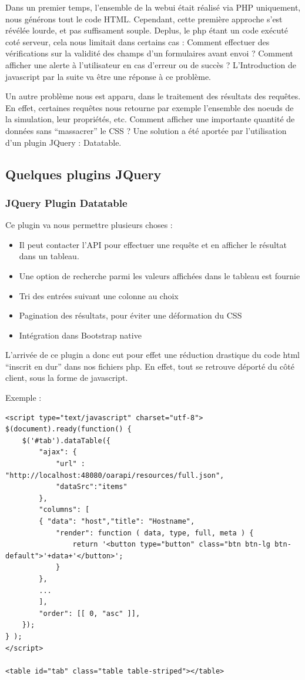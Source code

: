 \documentclass[a4paper,10pt]{article}
\begin{document}
Dans un premier temps, l'ensemble de la webui était réalisé via PHP uniquement, nous générons tout le code HTML. Cependant, cette première approche s'est révélée lourde, et pas suffisament souple.
Deplus, le php étant un code exécuté coté serveur, cela nous limitait dans certains cas : Comment effectuer des vérifications sur la validité des champs d'un formulaires avant envoi ? Comment afficher une alerte à l'utilisateur
en cas d'erreur ou de succès ? L'Introduction de javascript par la suite va être une réponse à ce problème.
\vspace{0.5cm}

Un autre problème nous est apparu, dans le traitement des résultats des requêtes. En effet, certaines requêtes nous retourne par exemple l'ensemble des noeuds de la simulation, leur propriétés, etc. Comment afficher une importante
quantité de données sans ``massacrer'' le CSS ? Une solution a été aportée par l'utilisation d'un plugin JQuery : Datatable.
\newpage
\subsection{Quelques plugins JQuery}
\subsubsection{JQuery Plugin Datatable}
Ce plugin va nous permettre plusieurs choses :
\begin{itemize}
 \item Il peut contacter l'API pour effectuer une requête et en afficher le résultat dans un tableau.
 \item Une option de recherche parmi les valeurs affichées dans le tableau est fournie
 \item Tri des entrées suivant une colonne au choix
 \item Pagination des résultats, pour éviter une déformation du CSS
 \item Intégration dans Bootstrap native
\end{itemize}

L'arrivée de ce plugin a donc eut pour effet une réduction drastique du code html ``inscrit en dur'' dans nos fichiers php.
En effet, tout se retrouve déporté du côté client, sous la forme de javascript.

Exemple :
\begin{lstlisting}
<script type="text/javascript" charset="utf-8">
$(document).ready(function() {
	$('#tab').dataTable({
		"ajax": {
			"url" : "http://localhost:48080/oarapi/resources/full.json",
			"dataSrc":"items"
		},
		"columns": [
		{ "data": "host","title": "Hostname",
			"render": function ( data, type, full, meta ) {
				return '<button type="button" class="btn btn-lg btn-default">'+data+'</button>';
		    }
		},
		...
		],
		"order": [[ 0, "asc" ]],
	});
} );
</script>

<table id="tab" class="table table-striped"></table>
\end{lstlisting}
\end{document}
